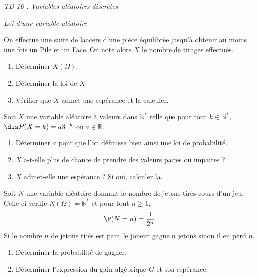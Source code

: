 \documentclass[a4paper,10pt]{report}
\begin{document}
\everymath{\displaystyle}

\begin{center}
\textit{{ {\huge TD 16 : Variables aléatoires discrètes}}}
\end{center}


\medskip

\begin{center}
\textit{{ {\large Loi d'une variable aléatoire}}}
\end{center}

\medskip

\begin{Exercice}{} On effectue une suite de lancers d'une pièce équilibrée jusqu'à obtenir au moins une fois un Pile et un Face. On note alors $X$ le nombre de tirages effectués.

\begin{enumerate}
\item Déterminer $X(\Omega)$.
\item Déterminer la loi de $X$. 
\item Vérifier que $X$ admet une espérance et la calculer.
\end{enumerate}
\end{Exercice}

\begin{Exercice}{}
 Soit $X$ une variable aléatoire à valeurs dans $\mathbb{N}^*$ telle que pour tout $k \in \mathbb{N}^*$, $\dis P(X=k)=a3^{-k}$ où $a \in \mathbb{R}$.
\begin{enumerate}
\item Déterminer $a$ pour que l'on définisse bien ainsi une loi de probabilité.
\item $X$ a-t-elle plus de chance de prendre des valeurs paires ou impaires ?
\item $X$ admet-elle une espérance ? Si oui, calculer la.
\end{enumerate}
\end{Exercice}



\begin{Exercice}{} Soit $N$ une variable aléatoire donnant le nombre de jetons tirés cours d'un jeu. Celle-ci vérifie $N(\Omega)= \mathbb{N}^*$ et pour tout $n \geq 1$,
$$ \P(N=n) = \dfrac{1}{2^n}$$
Si le nombre $n$ de jetons tirés est pair, le joueur gagne $n$ jetons sinon il en perd $n$.
\begin{enumerate}
\item Déterminer la probabilité de gagner.
\item Déterminer l'expression du gain algébrique $G$ et son espérance.
\end{enumerate}
\end{Exercice}
\end{document}
